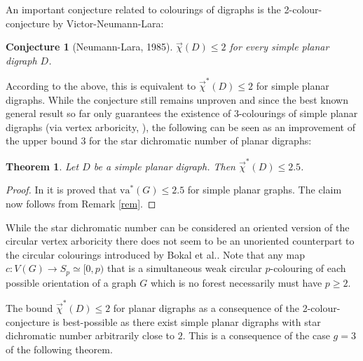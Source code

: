 \documentclass[fontsize=11pt,a4paper,DIV12]{scrartcl}
\theoremstyle{meiner}
\newtheorem{theorem}{Theorem}
\newtheorem{conjecture}{Conjecture}
\theoremstyle{definition}
\begin{document}
An important conjecture related to colourings of digraphs is the 2-colour-conjecture by Victor-Neumann-Lara:
\begin{conjecture}[Neumann-Lara, 1985]
$\vec{\chi}(D) \leq 2$ for every simple planar digraph $D$.
\end{conjecture}
According to the above, this is equivalent to $\vec{\chi}^\ast(D) \leq 2$ for simple planar digraphs. While the conjecture still remains unproven and since the best known general result so far only guarantees the existence of $3$-colourings of simple planar digraphs (via vertex arboricity,  \cite{chartrand2}), the following can be seen as an improvement of the upper bound $3$ for the star dichromatic number of planar digraphs:
\begin{theorem}
Let $D$ be a simple planar digraph. Then $\vec{\chi}^\ast(D) \leq 2.5$.
\end{theorem}
\begin{proof}
In \cite{fracvert} it is proved that $\text{va}^\ast(G) \leq 2.5$ for simple planar graphs. The claim now follows from Remark \ref{rem}.
\end{proof}

While the star dichromatic number can be considered an oriented version of
the circular vertex arboricity there does not seem to be an unoriented
counterpart to the circular colourings introduced by Bokal et al.. Note
that any map $c:V(G) \rightarrow S_p \simeq [0,p)$ that is a
simultaneous weak circular $p$-colouring of each possible orientation
of a graph $G$ which is no forest necessarily must have $p \ge 2$. 

The bound $\vec{\chi}^\ast(D) \leq 2$ for planar digraphs as a
consequence of the 2-colour-conjecture is best-possible as there exist
simple planar digraphs with star dichromatic number arbitrarily close
to $2$. This is a consequence of the case $g=3$ of the following
theorem.
\end{document}
